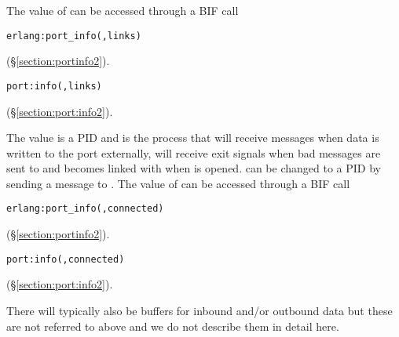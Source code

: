 \begin{Lentry}
The value of  can be accessed through a BIF call
\ifOld\begin{alltt}
erlang:port_info(,links)
\end{alltt}
(\S\ref{section:portinfo2}).\fi
\ifStd\begin{alltt}
port:info(,links)
\end{alltt}
(\S\ref{section:port:info2}).\fi
{}

\item[\T{owner[\Z{R}]}]
The value is a PID and is the process that will receive messages when
data is written to the port  externally, will receive exit
signals when bad messages are sent to  and becomes linked with
 when  is opened.  can be changed to a PID
 by sending a message  to .
The value of  can be accessed through a BIF call
\ifOld\begin{alltt}
erlang:port_info(,connected)
\end{alltt}
(\S\ref{section:portinfo2}).\fi
\ifStd\begin{alltt}
port:info(,connected)
\end{alltt}
(\S\ref{section:port:info2}).\fi
{}
\end{Lentry}

There will typically also be buffers for inbound and/or outbound data
but these are not referred to above and we do not describe them in
detail here.
